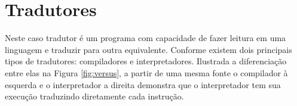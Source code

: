 


\section{Tradutores}


Neste caso tradutor é um programa com capacidade de fazer leitura em uma linguagem e traduzir para outra equivalente. Conforme  existem dois principais tipos de tradutores: compiladores e interpretadores. Ilustrada a diferenciação entre elas na Figura \ref{fig:versus}, a partir de uma mesma fonte o compilador à esquerda e o interpretador a direita demonstra que o interpretador tem sua execução traduzindo diretamente cada instrução.

